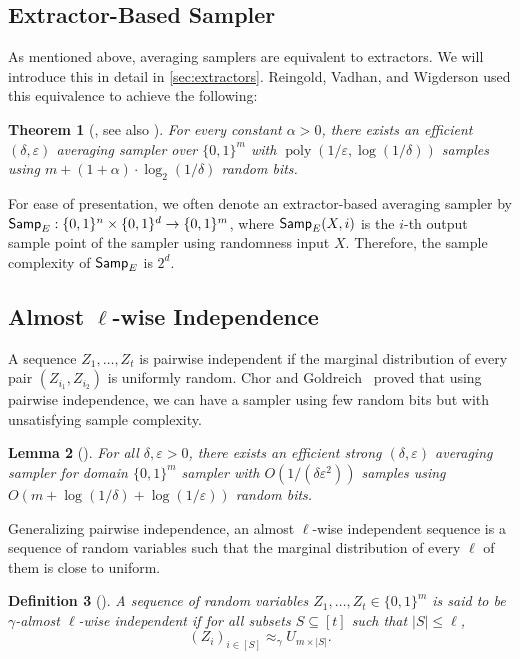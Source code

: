 \documentclass[10pt,a4paper]{article}
\newtheorem{theorem}{Theorem}
\newtheorem{lemma}[theorem]{Lemma}
\newtheorem{definition}[theorem]{Definition}
\DeclareMathOperator*{\poly}{poly}
\newcommand{\eps}{\varepsilon}
\newcommand{\1}{\mathbbm{1}}
\newcommand{\zo}{\{0, 1\}}
\newcommand{\Smp}{\textup{\textsf{Samp}}}
\begin{document}
\subsection{Extractor-Based Sampler}
As mentioned above, averaging samplers are equivalent to extractors. We will introduce this in detail in \cref{sec:extractors}.
Reingold, Vadhan, and Wigderson used this equivalence to achieve the following:

\begin{theorem}[, see also ]
\label{thm:optimal_existing_sampler}
For every constant $\alpha > 0$, there exists an efficient $(\delta, \eps)$ averaging sampler over $\zo^m$ with $\poly(1 / \eps, \log(1/\delta))$ samples using $m + (1 + \alpha) \cdot \log_2(1/\delta)$ random bits.
\end{theorem}
For ease of presentation, we often denote an extractor-based averaging sampler by $\Smp_{E} : \zo^n \times \zo^{d} \to \zo^m$, where $\Smp_{E}(X, i)$ is the $i$-th output sample point of the sampler using randomness input $X$. Therefore, the sample complexity of $\Smp_{E}$ is $2^d$.





\subsection{Almost $\ell$-wise Independence}
A sequence $Z_1, \dots, Z_t$ is pairwise independent if the marginal distribution of every pair $(Z_{i_1}, Z_{i_2})$ is uniformly random.
Chor and Goldreich~\cite{CG89} proved that using pairwise independence, we can have a sampler using few random bits but with unsatisfying sample complexity.
\begin{lemma}[\cite{CG89}]
    \label{lem:pairwise_independence}
    For all $\delta, \eps > 0$, there exists an efficient strong $(\delta, \eps)$ averaging sampler for domain $\zo^m$ sampler with $O(1 / (\delta \eps^2))$ samples using $O(m + \log(1/\delta) + \log(1 / \eps))$ random bits.
\end{lemma}

Generalizing pairwise independence, an almost $\ell$-wise independent  sequence is a sequence of random variables such that the marginal distribution of every $\ell$ of them is close to uniform. 

\begin{definition}[\cite{NN_almost_k_wise}]
A sequence of random variables $Z_1, \dots, Z_t \in \zo^m$  is said to be $\gamma$-almost $\ell$-wise independent  if for all subsets $S \subseteq [t]$ such that $|S| \le \ell$, \[
    (Z_i)_{i \in [S]} \approx_{\gamma} U_{m \times |S|}.
\]
\end{definition}
\end{document}
